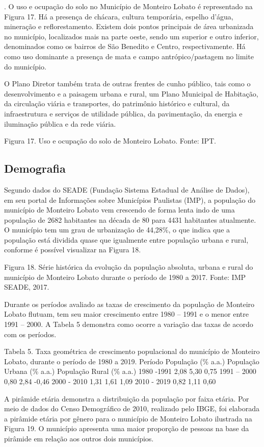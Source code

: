 . O uso e ocupação do solo no Município de Monteiro Lobato é representado na Figura 17. Há a presença de chácara, cultura temporária, espelho d’água, mineração e reflorestamento. Existem dois pontos principais de área urbanizada no município, localizados mais na parte oeste, sendo um superior e outro inferior, denominados como os bairros de São Benedito e Centro, respectivamente. Há como uso dominante a presença de mata e campo antrópico/pastagem no limite do município.

O Plano Diretor também trata de outras frentes de cunho público, tais como o desenvolvimento e a paisagem urbana e rural, um Plano Municipal de Habitação, da circulação viária e transportes, do patrimônio histórico e cultural, da infraestrutura e serviços de utilidade pública, da pavimentação, da energia e iluminação pública e da rede viária.

 
Figura 17. Uso e ocupação do solo de Monteiro Lobato.
Fonte: IPT.

\subsection{Demografia}
Segundo dados do SEADE (Fundação Sistema Estadual de Análise de Dados), em seu portal de Informações sobre Municípios Paulistas (IMP), a população do município de Monteiro Lobato vem crescendo de forma lenta indo de uma população de 2682 habitantes na década de 80 para 4431 habitantes atualmente. O município tem um grau de urbanização de 44,28\%, o que indica que a população está dividida quase que igualmente entre população urbana e rural, conforme é possível visualizar na Figura 18. 
 
Figura 18. Série histórica da evolução da população absoluta, urbana e rural do município de Monteiro Lobato durante o período de 1980 a 2017.
Fonte: IMP SEADE, 2017.

Durante os períodos avaliado as taxas de crescimento da população de Monteiro Lobato flutuam, tem seu maior crescimento entre 1980 – 1991 e o menor entre 1991 – 2000. A Tabela 5 demonstra como ocorre a variação das taxas de acordo com os períodos.

Tabela 5. Taxa geométrica de crescimento populacional do município de Monteiro Lobato, durante o período de 1980 a 2019.
Período	População
(\% a.a.)	População Urbana (\% a.a.)	População Rural (\% a.a.)
1980 -1991	2,08	5,30	0,75
1991 – 2000	0,80	2,84	-0,46
2000 - 2010	1,31	1,61	1,09
2010 - 2019	0,82	1,11	0,60

A pirâmide etária demonstra a distribuição da população por faixa etária. Por meio de dados do Censo Demográfico de 2010, realizado pelo IBGE, foi elaborada a pirâmide etária por gênero para o município de Monteiro Lobato ilustrada na Figura 19. O município apresenta uma maior proporção de pessoas na base da pirâmide em relação aos outros dois municípios.

